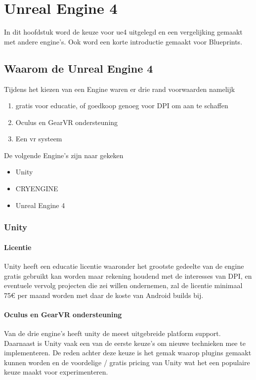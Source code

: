 \chapter{Unreal Engine 4}
In dit hoofdstuk word de keuze voor \gls{ue4} uitgelegd en een vergelijking gemaakt met andere engine's.
Ook word een korte introductie gemaakt voor Blueprints.

\section{Waarom de Unreal Engine 4}

Tijdens het kiezen van een Engine waren er drie rand voorwaarden namelijk 
\begin{enumerate}
	\item gratis voor educatie, of goedkoop genoeg voor DPI om aan te schaffen
	\item Oculus en GearVR ondersteuning
	\item Een \gls{vr} systeem
\end{enumerate}

De volgende Engine’s zijn naar gekeken 
\begin{itemize}
\item Unity
\item CRYENGINE
\item Unreal Engine 4
\end{itemize}

\subsection{Unity}

\subsubsection{Licentie}
Unity heeft een educatie licentie waaronder het grootste gedeelte van de engine gratis gebruikt kan worden maar rekening houdend met de interesses van DPI, en eventuele vervolg projecten die zei willen ondernemen, zal de licentie minimaal 75€ per maand worden met daar de koste van Android builds bij.

\subsubsection{Oculus en GearVR ondersteuning}
Van de drie engine’s heeft unity de meest uitgebreide platform support. Daarnaast is Unity vaak een van de eerste keuze’s om nieuwe technieken mee te implementeren. De reden achter deze keuze is het gemak waarop plugins gemaakt kunnen worden en de voordelige / gratis pricing van Unity wat het een populaire keuze maakt voor experimenteren.

